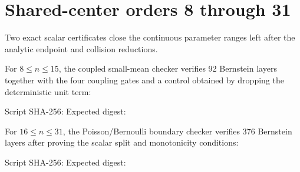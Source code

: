 \documentclass[11pt]{article}
\begin{document}
\section{Shared-center orders 8 through 31}


Two exact scalar certificates close the continuous parameter ranges left after
the analytic endpoint and collision reductions.

For $8\le n\le15$, the coupled small-mean checker verifies 92 Bernstein
layers together with the four coupling gates and a control obtained by dropping
the deterministic unit term:


Script SHA-256:
Expected digest:

For $16\le n\le31$, the Poisson/Bernoulli boundary checker verifies 376
Bernstein layers after proving the scalar split and monotonicity conditions:


Script SHA-256:
Expected digest:
\end{document}
